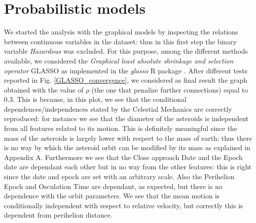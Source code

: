 \documentclass[12pt,%
               a4paper,%
               oneside,openany,%
               titlepage,%
               headinclude,footinclude,%
               BCOR5mm,%
               cleardoublepage=empty,%
               tablecaptionabove,%
               floatperchapter,
               ]{scrreprt}                 %
\begin{document}
\pagebreak

\section{Probabilistic models}

We started the analysis with the graphical models by inspecting the relations between continuous variables in the dataset: thus in this first step the binary variable \textit{Hazardous} was excluded. For this purpose, among the different methods available, we considered the \textit{Graphical least absolute shrinkage and selection operator} GLASSO as implemented in the \textit{glasso} R package \cite{friedman2008sparse,glasso}. After different tests reported in Fig. \ref{GLASSO_convergence}, we considered as final result the graph obtained with the value of $\rho$ (the one that penalize further connections) equal to $0.3$. This is because, in this plot, we see that the conditional dependences/independences stated by the Celestial Mechanics are correctly reproduced: for instance we see that the diameter of the asteroids is independent from all features related to its motion. This is definitely meaningful since the mass of the asteroids is largely lower with respect to the mass of earth: thus there is no way by which the asteroid orbit can be modified by its mass as explained in Appendix A. Furthermore we see that the Close approach Date and the Epoch date are dependant each other but in no way from the other features: this is right since the date and epoch are set with an arbitrary scale. Also the Perihelion Epoch and Osculation Time are dependant, as expected, but there is no dependence with the orbit parameters. We see that the mean motion is conditionally independent with respect to relative velocity, but correctly this is dependent from perihelion distance.
\end{document}
